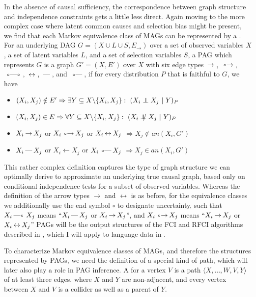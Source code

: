 In the absence of causal sufficiency, the correspondence between graph structure and independence constraints gets a little less direct. Again moving to the more complex case where latent common causes and selection bias might be present, we find that each Markov equivalence class of MAGs can be represented by a \textit{}. For an underlying DAG $G = (X \cup L \cup S,E_\rightarrow)$ over a set of observed variables $X$, a set of latent variables $L$, and a set of selection variables $S$, a PAG which represents $G$ is a graph $G' = (X, E')$ over $X$ with six edge types $\arrowLA$, $\arrowOA$, $\arrowOO$, $\arrowAA$, $\arrowLL$, and $\arrowOL$, if for every distribution $P$ that is faithful to $G$, we have
\begin{itemize}
 \item $(X_i,X_j) \notin E' \Rightarrow \exists Y \subseteq X \backslash \{X_i,X_j\}:\ (X_i \indep X_j\ |\ Y)_P$
 \item $(X_i,X_j) \in E \Rightarrow \forall Y \subseteq X \backslash \{X_i,X_j\}:\ (X_i \notindep X_j\ |\ Y)_P$
 \item $X_i \arrowLA X_j$ or $X_i \arrowOA X_j$ or $X_i \arrowAA X_j$ $\Rightarrow X_j \notin an(X_i,G')$
 \item $X_i \arrowLL X_j$ or $X_i \leftarrow X_j$ or $X_i \arrowOL X_j$ $\Rightarrow X_j \in an(X_i,G')$
\end{itemize}
This rather complex definition captures the type of graph structure we can optimally derive to approximate an underlying true causal graph, based only on conditional independence tests for a subset of observed variables. Whereas the definition of the arrow types $\rightarrow$ and $\leftrightarrow$ is as before, for the equivalence classes we additionally use the end symbol $\circ$ to designate uncertainty, such that $X_i \arrowLO X_j$ means ``$X_i \arrowLL X_j$ or $X_i \arrowLA X_j$'', and $X_i \arrowOA X_j$ means ``$X_i \arrowLA X_j$ or $X_i \arrowAA X_j$'' PAGs will be the output structures of the FCI and RFCI algorithms described in , which I will apply to language data in .

To characterize Markov equivalence classes of MAGs, and therefore the structures represented by PAGs, we need the definition of a special kind of path, which will later also play a role in PAG inference. A \textit{} for a vertex $V$ is a path $\langle X, \dots, W, V, Y \rangle$ of at least three edges, where $X$ and $Y$ are non-adjacent, and every vertex between $X$ and $V$ is a collider as well as a parent of $Y$.

